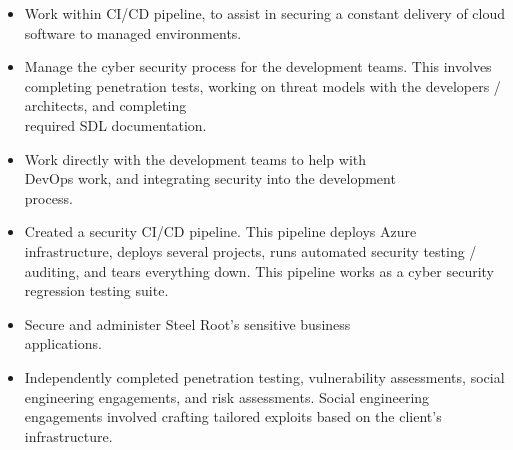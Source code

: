 \documentclass[10pt,a4paper,ragged2e]{altacv}
\begin{document}
\begin{paracol}{2}

\begin{itemize}
\item Work within CI/CD pipeline, to assist in securing a constant \break delivery of cloud software to managed environments.
\item Manage the cyber security process for the development teams. This involves completing penetration tests, working on threat models with the developers / architects, and completing\\ required SDL documentation. 
\item Work directly with the development teams to help with\\ DevOps work, and integrating security into the development\\ process.
\item Created a security CI/CD pipeline. This pipeline deploys Azure infrastructure, deploys several projects, runs automated security testing / auditing, and tears everything down. This pipeline works as a cyber security regression testing suite.
\end{itemize}

\divider

\begin{itemize}
\item Secure and administer Steel Root's sensitive business\\ applications.
\end{itemize}

\divider

\begin{itemize}
\item Independently completed penetration testing, vulnerability \break assessments, social engineering engagements, and risk assessments. Social engineering engagements involved crafting tailored exploits based on the client's infrastructure. 
\end{itemize}


\end{paracol}
\end{document}
